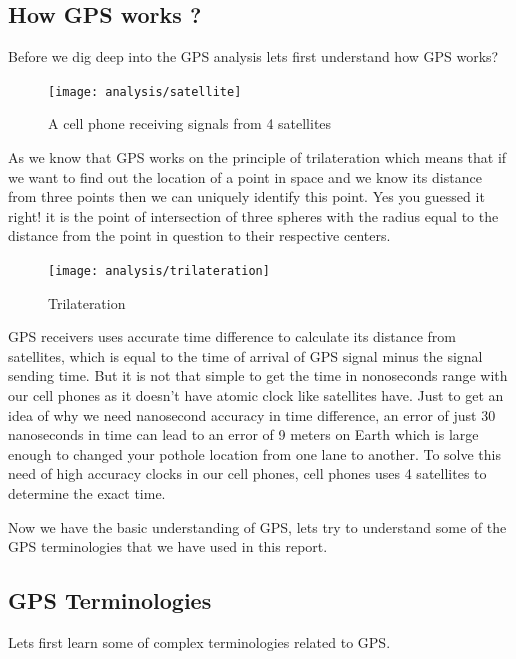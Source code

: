\documentclass[seminar]{report} \usepackage{longtable} \usepackage{tabu}
\begin{document}
\subsection{How GPS works ?}
Before we dig deep into the GPS analysis lets first understand how GPS works?

\begin{figure}[h]
  \centering
  \texttt{[image: analysis/satellite]}
  \caption{A cell phone receiving signals from 4 satellites}
  \label{satellite}
\end{figure}
As we know that GPS works on the principle of trilateration which means that if
we want to find out the location of a point in space and we know
it\textquotesingle s distance from three points then we can uniquely identify
this point. Yes you guessed it right! it is the point of intersection of three
spheres with the radius equal to the distance from the point in question to
their respective centers.
\begin{figure}[h]
  \centering
  \texttt{[image: analysis/trilateration]}
  \caption{Trilateration}
  \label{trilateration}
\end{figure}

GPS receivers uses accurate time difference to calculate it\textquotesingle s
distance from satellites, which is equal to the time of arrival of GPS signal
minus the signal sending time. But it is not that simple to get the time in
nonoseconds range with our cell phones as it doesn't have atomic clock like
satellites have. Just to get an idea of why we need nanosecond accuracy in time
difference, an error of just 30 nanoseconds in time can lead to an error of 9
meters on Earth which is large enough to changed your pothole location from one
lane to another. To solve this need of high accuracy clocks in our cell phones,
cell phones uses 4 satellites to determine the exact time.

Now we have the basic understanding of GPS, lets try to understand some of the
GPS terminologies that we have used in this report.


\subsection{GPS Terminologies}
Lets first learn some of complex terminologies related to GPS.
\end{document}
